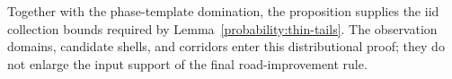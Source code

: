 Together with the phase-template domination, the proposition supplies
the iid collection bounds required by Lemma~\ref{probability:thin-tails}.
The observation domains, candidate shells, and corridors enter this
distributional proof; they do not enlarge the input support of the final
road-improvement rule.
